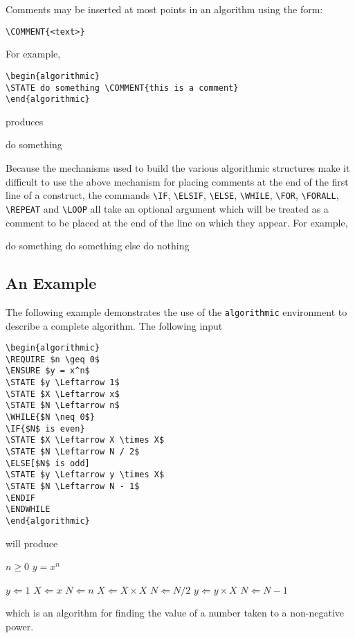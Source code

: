\documentclass[letterpaper]{article}
\newcommand{\keyword}[1]{\texttt{#1}}
\begin{document}
Comments may be inserted at most points in an algorithm using the form:
\begin{verbatim}
\COMMENT{<text>}
\end{verbatim}
For example,
\begin{verbatim}
\begin{algorithmic}
\STATE do something \COMMENT{this is a comment}
\end{algorithmic}
\end{verbatim}
produces
\begin{algorithmic}
  \STATE do something 
\end{algorithmic}
Because the mechanisms used to build the various algorithmic structures
make it difficult to use the above mechanism for placing comments at the
end of the first line of a construct, the commands \verb+\IF+,
\verb+\ELSIF+, \verb+\ELSE+, \verb+\WHILE+, \verb+\FOR+, \verb+\FORALL+,
\verb+\REPEAT+ and \verb+\LOOP+ all take an optional argument which will
be treated as a comment to be placed at the end of the line on which
they appear.  For example,
\begin{algorithmic}
  \STATE do something
  \STATE do something else
  \STATE do nothing
    \ENDIF
\end{algorithmic}

\subsection{An Example}

The following example demonstrates the use of the \keyword{algorithmic}
environment to describe a complete algorithm.  The following input
\begin{verbatim}
\begin{algorithmic}
\REQUIRE $n \geq 0$
\ENSURE $y = x^n$
\STATE $y \Leftarrow 1$
\STATE $X \Leftarrow x$
\STATE $N \Leftarrow n$
\WHILE{$N \neq 0$}
\IF{$N$ is even}
\STATE $X \Leftarrow X \times X$
\STATE $N \Leftarrow N / 2$
\ELSE[$N$ is odd]
\STATE $y \Leftarrow y \times X$
\STATE $N \Leftarrow N - 1$
\ENDIF
\ENDWHILE
\end{algorithmic}
\end{verbatim}
will produce
\begin{algorithmic}
  \REQUIRE $n \geq 0$
  \ENSURE $y = x^n$

  \STATE $y \Leftarrow 1$
  \STATE $X \Leftarrow x$
  \STATE $N \Leftarrow n$
      \STATE $X \Leftarrow X \times X$
      \STATE $N \Leftarrow N / 2$
    \ELSE[$N$ is odd]
      \STATE $y \Leftarrow y \times X$
      \STATE $N \Leftarrow N - 1$
    \ENDIF
  \ENDWHILE
\end{algorithmic}
which is an algorithm for finding the value of a number taken to a
non-negative power.
\end{document}

